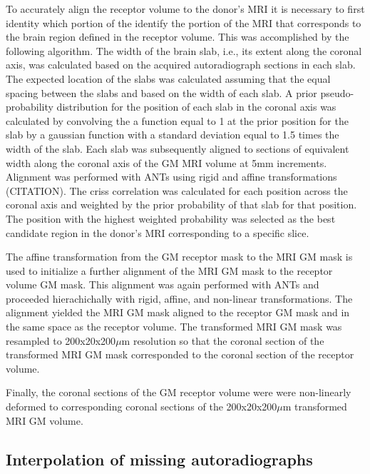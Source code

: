 \documentclass[12pt]{article}
\begin{document}
    To accurately align the receptor volume to the donor's MRI it is necessary to first identity which portion of the identify the portion of the MRI that corresponds to the brain region defined in the receptor volume. This was accomplished by the following algorithm. The width of the brain slab, i.e., its extent along the coronal axis, was calculated based on the acquired autoradiograph sections in each slab. The expected location of the slabs was calculated assuming that the equal spacing between the slabs and based on the width of each slab. A prior pseudo-probability distribution for the position of each slab in the coronal axis was calculated by convolving the a function equal to 1 at the prior position for the slab by a gaussian function with a standard deviation equal to  1.5 times the width of the slab. Each slab was subsequently aligned to sections of equivalent width along the coronal axis of the GM MRI volume at 5mm increments. Alignment was performed with ANTs using rigid and affine transformations (CITATION). The criss correlation was calculated for each position across the coronal axis and weighted by the prior probability of that slab for that position. The position with the highest weighted probability was selected as the best candidate region in the donor's MRI corresponding to a specific slice. 
    
    The affine transformation from the GM receptor mask to the MRI GM mask is used to initialize a further alignment of the MRI GM mask to the receptor volume GM mask. This alignment was again performed with ANTs and proceeded hierachichally with rigid, affine, and non-linear transformations. The alignment yielded the MRI GM mask aligned to the receptor GM mask and in the same space as the receptor volume. The transformed MRI GM mask was resampled to 200x20x200$\mu$m resolution so that the coronal section of the transformed MRI GM mask corresponded to the coronal section of the receptor volume. 
    
    Finally, the coronal sections of the GM receptor volume were were non-linearly deformed to corresponding coronal sections of the 200x20x200$\mu$m transformed MRI GM volume.
    
\subsection{Interpolation of missing autoradiographs}
\end{document}
